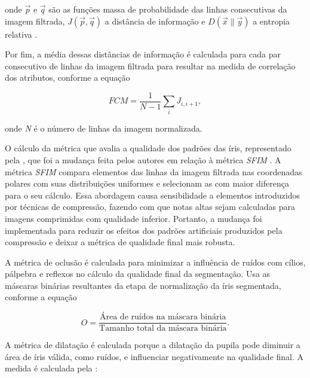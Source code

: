 \noindent onde $\vec{p}$ e $\vec{q}$ são as funções massa de probabilidade das linhas consecutivas da imagem filtrada, $J(\vec{p},\vec{q})$ a distância de informação e $D(\vec{x}\parallel\vec{y})$ a entropia relativa \cite{Mackay2002-RelativeEntropy}.

\par Por fim, a média dessas distâncias de informação é calculada para cada par consecutivo de linhas da imagem filtrada para resultar na medida de correlação dos atributos, conforme a equação

\begin{equation}\label{eq:fce:fcm5}
    FCM = \frac{1}{N - 1}\sum_{i}J_{i, i+1},
\end{equation}

\noindent onde \textit{N} é o número de linhas da imagem normalizada. 

\par O cálculo da métrica que avalia a qualidade dos padrões das íris, representado pela , que foi a mudança feita pelos autores em relação à métrica \textit{\acrshort{SFIM}} \cite{belcher2008}. A métrica \textit{\acrshort{SFIM}} compara elementos das linhas da imagem filtrada nas coordenadas polares com suas distribuições uniformes e selecionam as com maior diferença para o seu cálculo. Essa abordagem causa sensibilidade a elementos introduzidos por técnicas de compressão, fazendo com que notas altas sejam calculadas para imagens comprimidas com qualidade inferior. Portanto, a mudança foi implementada para reduzir os efeitos dos padrões artificiais produzidos pela compressão e deixar a métrica de qualidade final mais robusta.

\par A métrica de oclusão é calculada para minimizar a influência de ruídos com cílios, pálpebra e reflexos no cálculo da qualidade final da segmentação. Usa as máscaras binárias resultantes da etapa de normalização da íris segmentada, conforme a equação

\begin{equation}\label{eq:fce:O}
    O = \frac{\text{Área de ruídos na máscara binária}}{\text{Tamanho total da máscara binária}}.
\end{equation}

\par A métrica de dilatação é calculada porque a dilatação da pupila pode diminuir a área de íris válida, como ruídos, e influenciar negativamente na qualidade final.
A medida é calculada pela :

